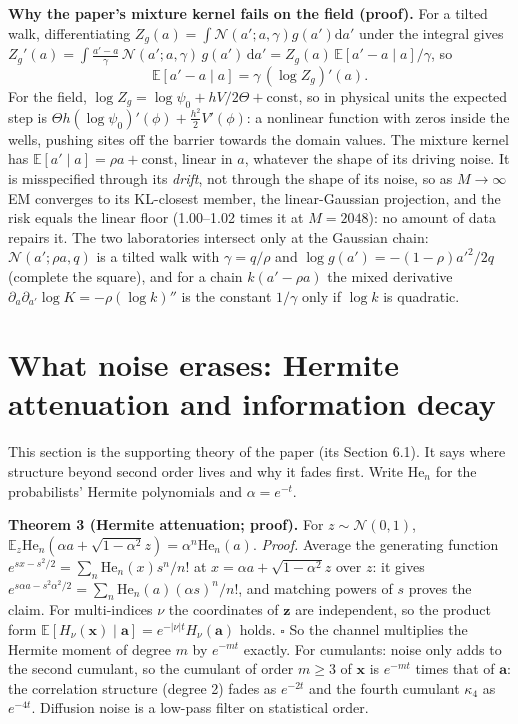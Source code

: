 \textbf{Why the paper's mixture kernel fails on the field (proof).} For a tilted walk, differentiating $Z_g(a)=\int\mathcal N(a';a,\gamma)g(a')\mathrm da'$ under the integral gives
$Z_g'(a)=\int\frac{a'-a}{\gamma}\,\mathcal N(a';a,\gamma)\,g(a')\,\mathrm da'=Z_g(a)\,\mathbb E[a'-a\mid a]/\gamma$, so
\begin{equation}\label{eq:drift}
\mathbb E[a'-a\mid a]=\gamma\,(\log Z_g)'(a).
\end{equation}
For the field, $\log Z_g=\log\psi_0+hV/2\Theta+\text{const}$, so in physical units the expected step is $\Theta h(\log\psi_0)'(\phi)+\tfrac{h^2}{2}V'(\phi)$: a nonlinear function with zeros inside the wells, pushing sites off the barrier towards the domain values.
The mixture kernel has $\mathbb E[a'\mid a]=\rho a+\text{const}$, linear in $a$, whatever the shape of its driving noise. It is misspecified through its \emph{drift}, not through the shape of its noise, so as $M\to\infty$ EM converges to its KL-closest member, the linear-Gaussian projection, and the risk equals the linear floor (1.00--1.02 times it at $M=2048$): no amount of data repairs it.
The two laboratories intersect only at the Gaussian chain: $\mathcal N(a';\rho a,q)$ is a tilted walk with $\gamma=q/\rho$ and $\log g(a')=-(1-\rho)a'^2/2q$ (complete the square), and for a chain $k(a'-\rho a)$ the mixed derivative $\partial_a\partial_{a'}\log K=-\rho(\log k)''$ is the constant $1/\gamma$ only if $\log k$ is quadratic.

\section{What noise erases: Hermite attenuation and information decay}

This section is the supporting theory of the paper (its Section 6.1). It says where structure beyond second order lives and why it fades first. Write $\mathrm{He}_n$ for the probabilists' Hermite polynomials and $\alpha=e^{-t}$.

\textbf{Theorem 3 (Hermite attenuation; proof).} For $z\sim\mathcal N(0,1)$, $\mathbb E_z\mathrm{He}_n(\alpha a+\sqrt{1-\alpha^2}z)=\alpha^n\mathrm{He}_n(a)$. \emph{Proof.} Average the generating function $e^{sx-s^2/2}=\sum_n\mathrm{He}_n(x)s^n/n!$ at $x=\alpha a+\sqrt{1-\alpha^2}z$ over $z$: it gives $e^{s\alpha a-s^2\alpha^2/2}=\sum_n\mathrm{He}_n(a)(\alpha s)^n/n!$, and matching powers of $s$ proves the claim. For multi-indices
$\nu$ the coordinates of $\mathbf z$ are independent, so the product form $\mathbb E[H_\nu(\mathbf x)\mid\mathbf a]=e^{-|\nu|t}H_\nu(\mathbf a)$ holds. $\square$ So the channel multiplies the Hermite moment of degree $m$ by $e^{-mt}$ exactly. For cumulants: noise only adds to the second cumulant, so the cumulant of order $m\ge3$ of $\mathbf x$ is $e^{-mt}$ times that of $\mathbf a$:
the correlation structure (degree 2) fades as $e^{-2t}$ and the fourth cumulant $\kappa_4$ as $e^{-4t}$. Diffusion noise is a low-pass filter on statistical order.


